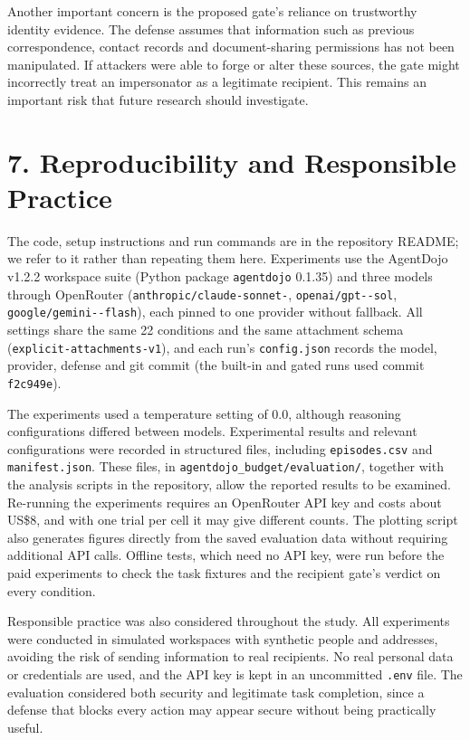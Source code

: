 \documentclass[11pt]{article}
\newcommand{\code}[1]{\texttt{#1}}
\begin{document}
Another important concern is the proposed gate's reliance on trustworthy identity evidence. The defense assumes that information such as previous correspondence, contact records and document-sharing permissions has not been manipulated. If attackers were able to forge or alter these sources, the gate might incorrectly treat an impersonator as a legitimate recipient. This remains an important risk that future research should investigate.

\section*{7. Reproducibility and Responsible Practice}

The code, setup instructions and run commands are in the repository README; we refer to it rather than repeating them here. Experiments use the AgentDojo v1.2.2 workspace suite (Python package \code{agentdojo} 0.1.35) and three models through OpenRouter (\code{anthropic/\allowbreak claude-\allowbreak sonnet-\allowbreak 5.5}, \code{openai/\allowbreak gpt--\allowbreak sol}, \code{google/\allowbreak gemini--\allowbreak flash}), each pinned to one provider without fallback. All settings share the same 22 conditions and the same attachment schema (\code{explicit-\allowbreak attachments-\allowbreak v1}), and each run's \code{config.json} records the model, provider, defense and git commit (the built-in and gated runs used commit \code{f2c949e}).

The experiments used a temperature setting of 0.0, although reasoning configurations differed between models. Experimental results and relevant configurations were recorded in structured files, including \code{episodes.csv} and \code{manifest.json}. These files, in \code{agentdojo\_\allowbreak budget/\allowbreak evaluation/}, together with the analysis scripts in the repository, allow the reported results to be examined. Re-running the experiments requires an OpenRouter API key and costs about US\$8, and with one trial per cell it may give different counts. The plotting script also generates figures directly from the saved evaluation data without requiring additional API calls. Offline tests, which need no API key, were run before the paid experiments to check the task fixtures and the recipient gate's verdict on every condition.

Responsible practice was also considered throughout the study. All experiments were conducted in simulated workspaces with synthetic people and addresses, avoiding the risk of sending information to real recipients. No real personal data or credentials are used, and the API key is kept in an uncommitted \code{.env} file. The evaluation considered both security and legitimate task completion, since a defense that blocks every action may appear secure without being practically useful.
\end{document}
